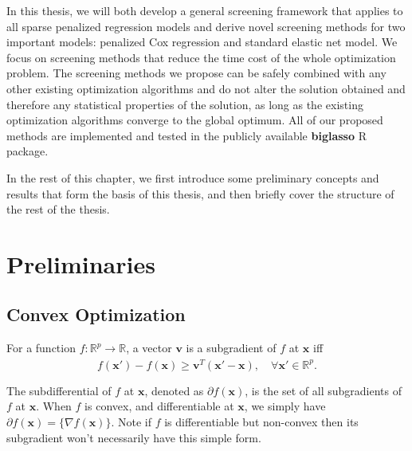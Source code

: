 In this thesis, we will both develop a general screening framework that applies to all sparse penalized regression models and derive novel screening methods for two important models: penalized Cox regression and standard elastic net model. We focus on screening methods that reduce the time cost of the whole optimization problem. The screening methods we propose can be safely combined with any other existing optimization algorithms and do not alter the solution obtained and therefore any statistical properties of the solution, as long as the existing optimization algorithms converge to the global optimum. All of our proposed methods are implemented and tested in the publicly available \textbf{biglasso} R package.

In the rest of this chapter, we first introduce some preliminary concepts and results that form the basis of this thesis, and then briefly cover the structure of the rest of the thesis.

\section{Preliminaries}

\subsection{Convex Optimization}

For a function $f:\mathbb{R}^p\xrightarrow[]{}\mathbb{R}$, a vector $\boldsymbol v$ is a subgradient of $f$ at $\boldsymbol x$ iff
\begin{equation}
    f(\boldsymbol x')-f(\boldsymbol x)\geq \boldsymbol v^T(\boldsymbol x'-\boldsymbol x),\quad\forall \boldsymbol x'\in \mathbb{R}^p.
\end{equation}

The subdifferential of $f$ at $\boldsymbol x$, denoted as $\partial f(\boldsymbol x)$, is the set of all subgradients of $f$ at $\boldsymbol x$. When $f$ is convex, and differentiable at $\boldsymbol x$, we simply have $\partial f(\boldsymbol x)=\{\nabla f(\boldsymbol x)\}$. Note if $f$ is differentiable but non-convex then its subgradient won't necessarily have this simple form.

